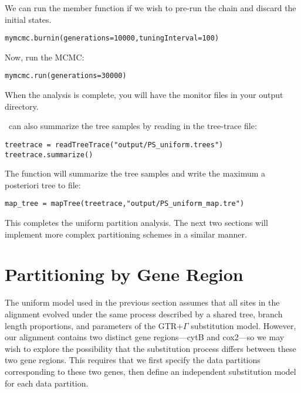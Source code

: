We can run the  member function if we wish to pre-run the chain and discard the initial states. 
{\tt \begin{snugshade*}
\begin{lstlisting}
mymcmc.burnin(generations=10000,tuningInterval=100)
\end{lstlisting}
\end{snugshade*}}


Now, run the MCMC:
{\tt \begin{snugshade*}
\begin{lstlisting}
mymcmc.run(generations=30000)
\end{lstlisting}
\end{snugshade*}}

When the analysis is complete, you will have the monitor files in your output directory.

\RevBayes~can also summarize the tree samples by reading in the tree-trace file:
{\tt \begin{snugshade*}
\begin{lstlisting}
treetrace = readTreeTrace("output/PS_uniform.trees")
treetrace.summarize()
\end{lstlisting}
\end{snugshade*}}


The  function will summarize the tree samples and write the maximum a posteriori tree to file:
{\tt \begin{snugshade*}
\begin{lstlisting}
map_tree = mapTree(treetrace,"output/PS_uniform_map.tre")
\end{lstlisting}
\end{snugshade*}}

This completes the uniform partition analysis.
The next two sections will implement more complex partitioning schemes in a similar manner.


\section{Partitioning by Gene Region}\label{secByGene}

The uniform model used in the previous section assumes that all sites in the alignment evolved under the same process described by a shared tree, branch length proportions, and parameters of the GTR+$\Gamma$ substitution model.
However, our alignment contains two distinct gene regions---cytB and cox2---so we may wish to explore the possibility that the substitution process differs between these two gene regions.
This requires that we first specify the data partitions corresponding to these two genes, then define an independent substitution model for each data partition. 

